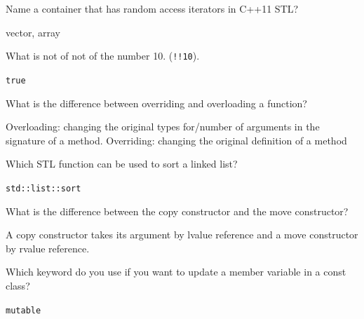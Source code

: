 \documentclass{exam}%
\begin{document}
\begin{questions}
\question Name a container that has random access iterators in C++11 STL?
\begin{solution}[.2in]
	vector, array
\end{solution}

\question What is not of not of the number 10. (\lstinline{!!10}).
\begin{solution}[.2in]
	\lstinline{true}
\end{solution}

\question What is the difference between overriding and overloading a function?
\begin{solution}[.2in]
Overloading: changing the original types for/number of arguments in the signature of a method. Overriding: changing the original definition of a method
\end{solution}

\question Which STL function can be used to sort a linked list?
\begin{solution}[.2in]
	\lstinline{std::list::sort}
\end{solution}

\question What is the difference between the copy constructor and the move constructor?
\begin{solution}[.2in]
A copy constructor takes its argument by lvalue reference and a move constructor by rvalue reference.
\end{solution}

\question Which keyword do you use if you want to update a member variable in a const class?
\begin{solution}[.2in]
	\lstinline{mutable}
\end{solution}


\end{questions}
\end{document}
